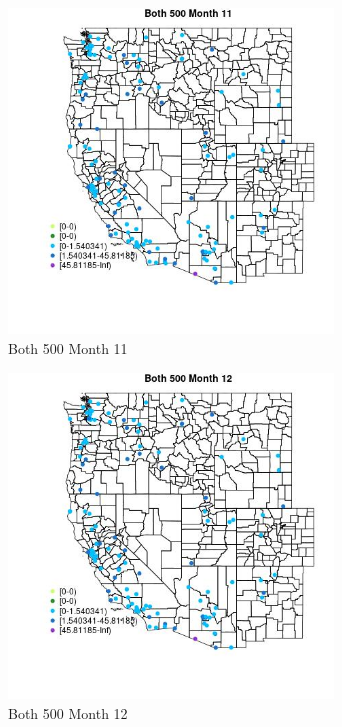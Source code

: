 \begin{figure} 
\centering  
\includegraphics[width=0.77\textwidth]{Code_Outputs/Report_ML_input_PM25_Step4_part_e_de_duplicated_aves_MapObsMo11Both_500.jpg} 
\caption{\label{fig:Report_ML_input_PM25_Step4_part_e_de_duplicated_avesMapObsMo11Both_500}Both 500 Month 11} 
\end{figure} 
 

\clearpage 

\begin{figure} 
\centering  
\includegraphics[width=0.77\textwidth]{Code_Outputs/Report_ML_input_PM25_Step4_part_e_de_duplicated_aves_MapObsMo12Both_500.jpg} 
\caption{\label{fig:Report_ML_input_PM25_Step4_part_e_de_duplicated_avesMapObsMo12Both_500}Both 500 Month 12} 
\end{figure} 
 

